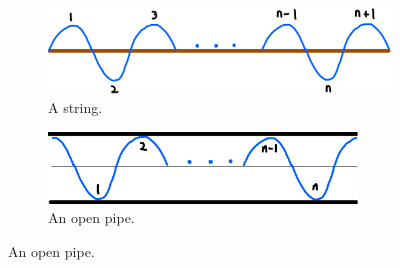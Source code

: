 \documentclass[oneside]{book}
\begin{document}
\begin{itemize}
\begin{table}[H]
        \label{table:overtones-and-harmonics}
    \end{table}
    \begin{figure}[H]
        \centering
        \begin{subfigure}[c]{0.5\textwidth}
            \centering
            \includegraphics[width=\textwidth]{../images/StringStatWaves.jpg}
            \caption{A string.}
        \end{subfigure}%
        \begin{subfigure}[c]{0.5\textwidth}
            \centering
            \includegraphics[width=0.9\textwidth]{../images/Open Pipe.jpg}
            \caption{An open pipe.}
        \end{subfigure}%


\end{figure}
\end{itemize}
\end{document}
